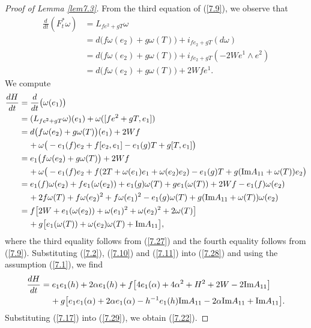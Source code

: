 \documentclass{amsart}
\theoremstyle{Corollary}
\numberwithin{equation}{section}
\begin{document}
\begin{proof}[Proof of Lemma \ref{lem7.3}]
From the third equation of (\ref{7.9}),
we observe that 
\begin{equation}\label{7.27}
\begin{split}
\frac{d}{dt}
(F_t^*\omega)
&=L_{fe^2+gT}\omega\\
&=d\big(f\omega(e_2)+g\omega(T)\big)+i_{fe_2+gT}(d\omega)\\
&=d\big(f\omega(e_2)+g\omega(T)\big)+i_{fe_2+gT}(-2We^1\wedge e^2)\\
&=d\big(f\omega(e_2)+g\omega(T)\big)+2Wfe^1.
\end{split}
\end{equation}
We compute 
\begin{equation}\label{7.28}
\begin{split}
\frac{dH}{dt}&=\frac{d}{dt}\big(\omega(e_1)\big)\\
&=(L_{fe^2+gT}\omega)(e_1)+\omega([fe^2+gT,e_1])\\
&=d\big(f\omega(e_2)+g\omega(T)\big)(e_1)+2Wf\\
&\hspace{4mm}
+\omega\big(-e_1(f)e_2+f[e_2,e_1]-e_1(g)T+g[T,e_1]\big)\\
&=e_1\big(f\omega(e_2)+g\omega(T)\big) +2Wf\\
&\hspace{4mm}
+\omega\big(-e_1(f)e_2+f(2T+\omega(e_1)e_1+\omega(e_2)e_2)-e_1(g)T+g(\mbox{Im}A_{11}+\omega(T))e_2\big)\\
&=e_1(f)\omega(e_2)+fe_1(\omega(e_2))+e_1(g)\omega(T)+ge_1(\omega(T))+2Wf-e_1(f)\omega(e_2)\\
&\hspace{4mm}+2f\omega(T)+f\omega(e_2)^2+f\omega(e_1)^2
-e_1(g)\omega(T)+g(\mbox{Im}A_{11}+\omega(T))\omega(e_2)\\
&=f\big[2W+e_1(\omega(e_2))+\omega(e_1)^2+\omega(e_2)^2+2\omega(T)\big]\\
&\hspace{4mm}+g\big[e_1(\omega(T))+\omega(e_2)\omega(T)+\mbox{Im}A_{11}\big],
\end{split}
\end{equation}
where the third equality follows from  (\ref{7.27})
and
the fourth equality follows from (\ref{7.9}).
Substituting (\ref{7.2}), (\ref{7.10})
and (\ref{7.11}) into (\ref{7.28})
and using the assumption (\ref{7.1}), 
we find 
\begin{equation}\label{7.29}
\begin{split}
\frac{dH}{dt}&=
e_1e_1(h)+2\alpha e_1(h)
+f\big[4e_1(\alpha)+4\alpha^2+H^2+2W-2\mbox{Im}A_{11}\big]\\
&\hspace{4mm}
+g\big[e_1e_1(\alpha)+2\alpha e_1(\alpha)
-h^{-1}e_1(h)\mbox{Im}A_{11}-2\alpha \mbox{Im}A_{11}+\mbox{Im}A_{11}\big].
\end{split}
\end{equation}
Substituting (\ref{7.17}) into (\ref{7.29}), 
we obtain (\ref{7.22}). 



\end{proof}
\end{document}
